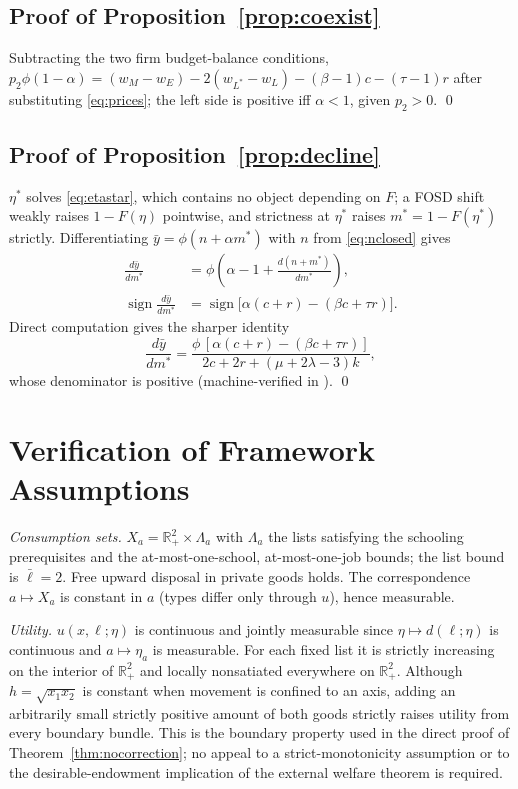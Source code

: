 \documentclass[12pt,letterpaper]{article}
\theoremstyle{definition}
\newcommand{\Lists}{\Lambda}
\newcommand{\R}{\mathbb{R}}
\begin{document}
\subsection{Proof of Proposition~\ref{prop:coexist}} Subtracting the two firm budget-balance conditions, $p_2\phi(1-\alpha) = (w_M - w_E) - 2(w_{L^\ast}-w_L) - (\beta-1)c - (\tau-1)r$ after substituting \eqref{eq:prices}; the left side is positive iff $\alpha<1$, given $p_2>0$.
\qed

\subsection{Proof of Proposition~\ref{prop:decline}} $\eta^\ast$ solves \eqref{eq:etastar}, which contains no object depending on $F$; a FOSD shift weakly raises $1-F(\eta)$ pointwise, and strictness at $\eta^\ast$ raises $m^\ast=1-F(\eta^\ast)$ strictly.
Differentiating $\bar{y}=\phi(n+\alpha m^\ast)$ with $n$ from \eqref{eq:nclosed} gives
\[
\begin{aligned}
\frac{d\bar{y}}{dm^\ast}
&=\phi\left(\alpha-1+\frac{d(n+m^\ast)}{dm^\ast}\right),\\
\operatorname{sign}\frac{d\bar{y}}{dm^\ast}
&=\operatorname{sign}\big[\alpha(c+r)-(\beta c+\tau r)\big].
\end{aligned}
\]
Direct computation gives the sharper identity
\[
\frac{d\bar{y}}{dm^\ast}
=
\frac{\phi\,[\alpha(c+r)-(\beta c+\tau r)]}
{2c+2r+(\mu+2\lambda-3)k},
\]
whose denominator is positive (machine-verified in
).
\qed

\section{Verification of Framework Assumptions}\label{app:assumptions}

\emph{Consumption sets.}
$X_a = \R^2_+\times\Lists_a$ with $\Lists_a$ the lists satisfying the schooling prerequisites and the at-most-one-school, at-most-one-job bounds; the list bound is $\bar\ell=2$.
Free upward disposal in private goods holds.
The correspondence $a\mapsto X_a$ is constant in $a$ (types differ only through $u$), hence measurable.

\emph{Utility.}
$u(x,\ell;\eta)$ is continuous and jointly measurable since $\eta\mapsto d(\ell;\eta)$ is continuous and $a\mapsto\eta_a$ is measurable.
For each fixed list it is strictly increasing on the interior of $\R^2_+$ and locally nonsatiated everywhere on $\R^2_+$.
Although $h=\sqrt{x_1x_2}$ is constant when movement is confined to an axis, adding an arbitrarily small strictly positive amount of both goods strictly raises utility from every boundary bundle.
This is the boundary property used in the direct proof of Theorem~\ref{thm:nocorrection}; no appeal to a strict-monotonicity assumption or to the desirable-endowment implication of the external welfare theorem is required.
\end{document}
